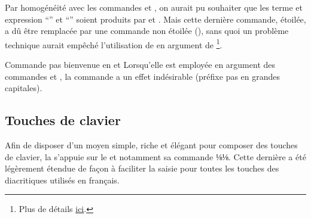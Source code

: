 \documentclass{letgut}
\begin{document}
Par homogénéité avec les commandes  et , on aurait
pu souhaiter que les terme et expression \enquote{} et
\enquote{} soient produits par  et
. Mais cette dernière commande, étoilée, a dû être
remplacée par une commande non étoilée (), sans quoi un
problème technique aurait empêché l'utilisation de  en argument
de %
\footnote{Plus de détails
  \href{https://tex.stackexchange.com/q/493017/18401}{ici}.}.

\begin{dbwarning}{Commande  pas bienvenue en  et
    }{}
  Lorsqu'elle est employée en argument des commandes  et
  , la commande  a un effet indésirable
  (préfixe pas en grandes capitales).
\end{dbwarning}

\subsection{Touches de clavier}
\label{sec:touches-de-clavier}

Afin de disposer d'un moyen simple, riche et élégant pour composer des touches
de clavier, la  s'appuie sur le  et notamment sa
commande ⅛\LKey⅛. Cette dernière a été légèrement étendue de façon à faciliter
la saisie pour toutes les touches des diacritiques utilisés en français.

\begin{ltx-code-result}[title addon=touches de clavier]
   

 

\LKeyCtrl \LKeyAlt \LKeyAltGr \LKeyShift \LKeyEnter \LKeyTab

   

\LKeyAt \LKeyScreenUp \LKeyScreenDown \LKeyCommand \LKeyOptionKey

\LMouseN \LMouseL \LMouseM \LMouseR

   

     
     
   
 
     
   
\end{ltx-code-result}
\end{document}
